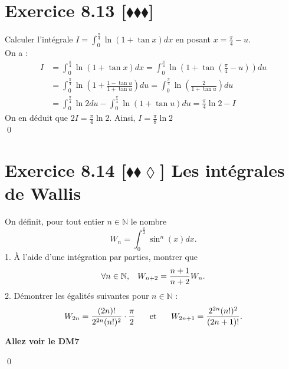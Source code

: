 \documentclass[10pt]{article}
\begin{document}
\section*{Exercice 8.13 [$\blacklozenge\blacklozenge\blacklozenge$]}
\begin{tcolorbox}[enhanced, width=7in, center, size=fbox, fontupper=\large, drop shadow southwest]
    Calculer l'intégrale $I = \int_0^{\frac{\pi}{4}}{\ln(1+\tan x)dx}$ en posant $x=\frac{\pi}{4}-u$.\\
    On a :
    \begin{align*}
        I &= \int_0^{\frac{\pi}{4}}{\ln(1+\tan x)dx} = \int_{0}^{\frac{\pi}{4}}{\ln\left(1+\tan\left(\frac{\pi}{4}-u\right)\right)du}\\
        &=\int^{\frac{\pi}{4}}_0{\ln\left(1+\frac{1-\tan u}{1+\tan u}\right)du}=\int_0^{\frac{\pi}{4}}{\ln\left(\frac{2}{1+\tan u}\right)du}\\
        &=\int_0^{\frac{\pi}{4}}{\ln2du}-\int_0^{\frac{\pi}{4}}{\ln(1+\tan u)du} = \frac{\pi}{4}\ln2 - I
    \end{align*}
    On en déduit que $2I = \frac{\pi}{4}\ln2$. Ainsi, $I=\frac{\pi}{8}\ln2$\\
    \qed
\end{tcolorbox}


\section*{Exercice 8.14 [$\blacklozenge\blacklozenge\lozenge$] Les intégrales de Wallis}
\begin{tcolorbox}[enhanced, width=7in, center, size=fbox, fontupper=\large, drop shadow southwest]
    On définit, pour tout entier $n\in\mathbb{N}$ le nombre
    \begin{equation*}
        W_n = \int_0^{\frac{\pi}{2}}{\sin^n(x)dx}.
    \end{equation*}
    1. À l'aide d'une intégration par parties, montrer que
    \begin{equation*}
        \forall{n\in\mathbb{N}}, \hspace{0.3cm} W_{n+2} = \frac{n+1}{n+2}W_n.
    \end{equation*}
    2. Démontrer les égalités suivantes pour $n\in\mathbb{N}$ :
    \begin{equation*}
        W_{2n}=\frac{(2n)!}{2^{2n}(n!)^2}\cdot\frac{\pi}{2} \hspace{0.5cm} \text{ et } \hspace{0.5cm} W_{2n+1}=\frac{2^{2n}(n!)^2}{(2n+1)!}.
    \end{equation*}
    \begin{center}
        \large{\textbf{Allez voir le DM7}}
    \end{center}
    \qed
\end{tcolorbox}
\end{document}
